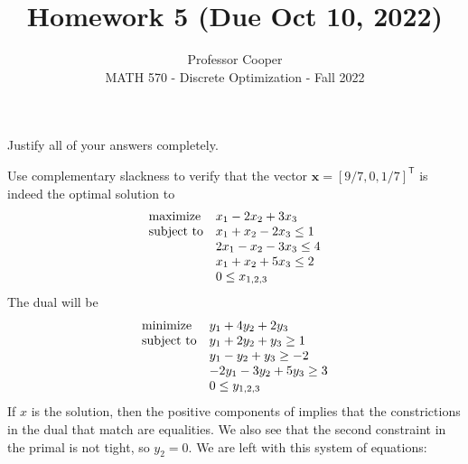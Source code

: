 \documentclass[12pt]{article}
\newenvironment{exercise}[2][Exercise]{\begin{trivlist}
\item[\hskip \labelsep {\bfseries #1}\hskip \labelsep {\bfseries #2.}]}{\end{trivlist}}
\begin{document}
 
 
\renewcommand{\qedsymbol}{$\blacksquare$}
 
\title{Homework 5 (Due Oct 10, 2022)}
\author{Professor Cooper\\ %
MATH 570 - Discrete Optimization - Fall 2022} %

\maketitle

Justify all of your answers completely.

\begin{exercise}{1} Use complementary slackness to verify that the vector $\mathbf{x} = [9/7,0,1/7]^\mathsf{T}$ is indeed the optimal solution to
\begin{equation*}
\begin{array}{ll@{}ll}
\text{maximize}  & \displaystyle x_1 - 2x_2 + 3x_3 &\\
\text{subject to}& \displaystyle x_1 + x_2 - 2x_3 \leq 1   \\
                 & \displaystyle 2x_1 - x_2 - 3x_3 \leq 4 \\
                 & \displaystyle x_1 + x_2 + 5x_3 \leq 2 \\
                 & \displaystyle 0 \leq x_{1,2,3}
\end{array}
\end{equation*}
The dual will be 
\begin{equation*}
	\begin{array}{ll@{}ll}
		\text{minimize}  & \displaystyle y_1 + 4y_2 + 2y_3 &\\
		\text{subject to}& \displaystyle y_1 + 2y_2 + y_3 \geq 1   \\
		& \displaystyle y_1 - y_2 + y_3 \geq -2 \\
		& \displaystyle -2y_1 - 3y_2 + 5y_3 \geq 3 \\
		& \displaystyle 0 \leq y_{1,2,3}
	\end{array}
\end{equation*}
If $x$ is the solution, then the positive components of implies that the constrictions in the dual that match are equalities. We also see that the second constraint in the primal is not tight, so $y_2 = 0$. We are left with this system of equations:

\end{exercise}
\end{document}

